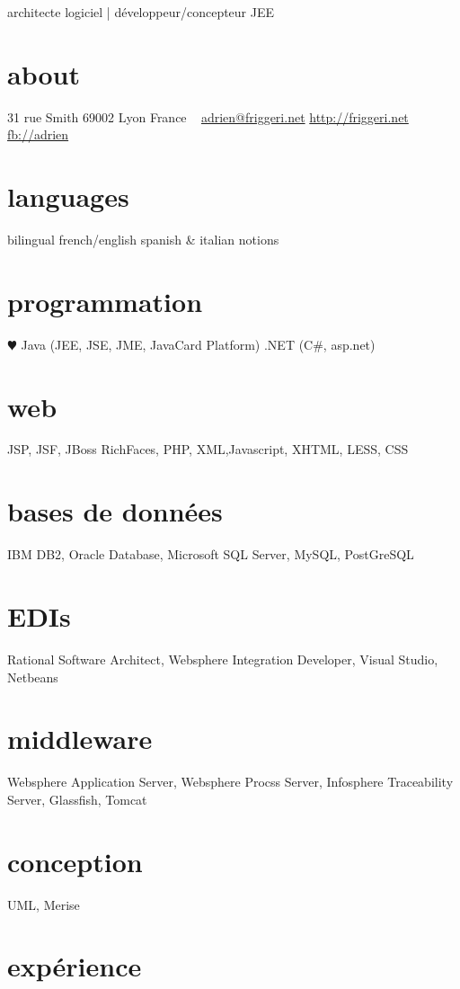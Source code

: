 \documentclass[]{roger-cv}
\begin{document}
       {architecte logiciel | développeur/concepteur JEE}


\begin{aside}
  \section{about}
    31 rue Smith
    69002 Lyon
    France
    ~
    \href{mailto:adrien@friggeri.net}{adrien@friggeri.net}
    \href{http://friggeri.net}{http://friggeri.net}
    \href{http://facebook.com/adrien}{fb://adrien}
  \section{languages}
    bilingual french/english
    spanish \& italian notions
  \section{programmation}
    {\color{red} $\varheartsuit$} Java (JEE, JSE, JME, JavaCard Platform)
    .NET (C\#, asp.net)
  \section{web}
    {JSP, JSF, JBoss RichFaces, PHP, XML,Javascript, XHTML, LESS, CSS}
  \section{bases de données}
    {IBM DB2, Oracle Database, Microsoft SQL Server, MySQL, PostGreSQL}
  \section{EDIs}
    {Rational Software Architect, Websphere Integration Developer, Visual Studio, Netbeans}
  \section{middleware}
    {Websphere Application Server, Websphere Procss Server, Infosphere Traceability Server, Glassfish, Tomcat}
  \section{conception}
    {UML, Merise}
\end{aside}

\section{expérience}
\end{document}
